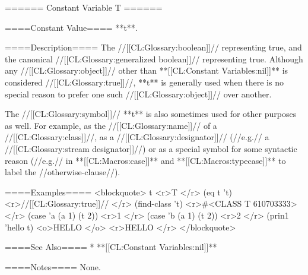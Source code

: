 ====== Constant Variable T ======

====Constant Value====
**t**.

====Description====
The //[[CL:Glossary:boolean]]// representing true, and the canonical //[[CL:Glossary:generalized boolean]]// representing true. Although any //[[CL:Glossary:object]]// other than **[[CL:Constant Variables:nil]]** is considered //[[CL:Glossary:true]]//, **t** is generally used when there is no special reason to prefer one such //[[CL:Glossary:object]]// over another.

The //[[CL:Glossary:symbol]]// **t** is also sometimes used for other purposes as well. For example, as the //[[CL:Glossary:name]]// of a //[[CL:Glossary:class]]//, as a //[[CL:Glossary:designator]]// (//e.g.// a //[[CL:Glossary:stream designator]]//) or as a special symbol for some syntactic reason (//e.g.// in **[[CL:Macros:case]]** and **[[CL:Macros:typecase]]** to label the //otherwise-clause//).

====Examples====
<blockquote> 
t <r>T </r>
(eq t 't) <r>//[[CL:Glossary:true]]// </r>
(find-class 't) <r>#<CLASS T 610703333> </r>
(case 'a (a 1) (t 2)) <r>1 </r>
(case 'b (a 1) (t 2)) <r>2 </r>
(prin1 'hello t)
<o>HELLO </o>
<r>HELLO </r>
</blockquote>

====See Also====
  * **[[CL:Constant Variables:nil]]**

====Notes====
None.


